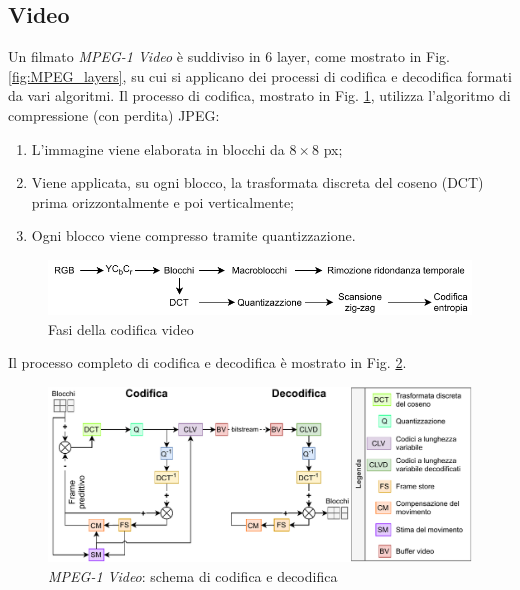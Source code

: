\subsection{Video}
Un filmato \textit{MPEG-1 Video} è suddiviso in 6 layer, come mostrato in Fig. \ref{fig:MPEG_layers}, su cui si applicano dei processi di codifica e decodifica formati da vari algoritmi. Il processo di codifica, mostrato in Fig. \ref{fig:mpegPhases}, utilizza l'algoritmo di compressione (con perdita) JPEG:

\begin{enumerate}
    \item L'immagine viene elaborata in blocchi da $8\times8$ px;
    \item Viene applicata, su ogni blocco, la trasformata discreta del coseno (DCT) prima orizzontalmente e poi verticalmente;
    \item Ogni blocco viene compresso tramite quantizzazione.
\end{enumerate}

\begin{figure}[H]
	\includegraphics[width=\linewidth]{immagini/mpegPhases}
	\caption{Fasi della codifica video}
	\label{fig:mpegPhases}
\end{figure}

Il processo completo di codifica e decodifica è mostrato in Fig. \ref{fig:MPEGCodingScheme}.

\begin{figure}[H]
	\includegraphics[width=\linewidth]{immagini/MPEGCodingScheme}
	\centering
	\caption{\textit{MPEG-1 Video}: schema di codifica e decodifica}
	\label{fig:MPEGCodingScheme}
\end{figure}



